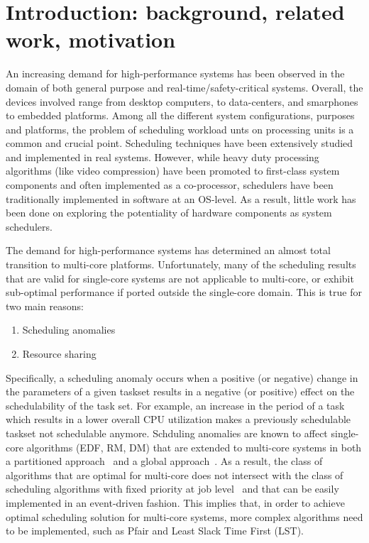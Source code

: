 \section{Introduction: background, related work, motivation}

An increasing demand for high-performance systems has been observed in
the domain of both general purpose and real-time/safety-critical
systems. Overall, the devices involved range from desktop computers,
to data-centers, and smarphones to embedded platforms. Among all the
different system configurations, purposes and platforms, the problem
of scheduling workload unts on processing units is a common and
crucial point. Scheduling techniques have been extensively studied and
implemented in real systems. However, while heavy duty processing
algorithms (like video compression) have been promoted to first-class
system components and often implemented as a co-processor, schedulers
have been traditionally implemented in software at an OS-level. As a
result, little work has been done on exploring the potentiality of
hardware components as system schedulers.

The demand for high-performance systems has determined an almost total
transition to multi-core platforms. Unfortunately, many of the
scheduling results that are valid for single-core systems are not
applicable to multi-core, or exhibit sub-optimal performance if ported
outside the single-core domain. This is true for two main reasons: 

\begin{enumerate}
\item Scheduling anomalies
\item Resource sharing
\end{enumerate}

Specifically, a scheduling anomaly occurs when a positive (or
negative) change in the parameters of a given taskset results in a
negative (or positive) effect on the schedulability of the task
set. For example, an increase in the period of a task which results in
a lower overall CPU utilization makes a previously schedulable taskset
not schedulable anymore. Schduling anomalies are known to affect
single-core algorithms (EDF, RM, DM) that are extended to multi-core
systems in both a partitioned approach~\cite{graham1972,
  andersson2003} and a global approach~\cite{andersson2003}. As a
result, the class of algorithms that are optimal for multi-core does
not intersect with the class of scheduling algorithms with fixed
priority at job level~\cite{andersson2003} and that can be easily
implemented in an event-driven fashion. This implies that, in order to
achieve optimal scheduling solution for multi-core systems, more
complex algorithms need to be implemented, such as Pfair and
Least Slack Time First (LST).

